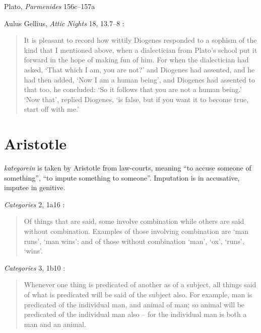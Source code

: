 \documentclass{article}
\begin{document}
Plato, {\em Parmenides} 156c--157a

Aulus Gellius, {\em Attic Nights} 18, 13.7--8 \cite[p.~32]{diogenes}:

\begin{quote}
It is pleasant to record how wittily Diogenes responded to
a sophism of the kind that I mentioned above, when a dialectician
from Plato's school put it forward in the hope of making fun of him.
For when the dialectician had asked, `That which I am, you are not?'
and Diogenes had assented, and he had then added, `Now I am a 
human being', and Diogenes had assented to that too, he concluded:
`So it follows that you are not a human being.' `Now that', replied
Diogenes, `is false, but if you want it to become true, start off with
me.'
\end{quote}

















\section{Aristotle}
{\em kategorein} is taken by Aristotle from law-courts, meaning ``to accuse someone of something'', ``to impute something
to someone''. Imputation is in accusative, imputee in genitive.

{\em Categories} 2, 1a16 \cite[p.~3]{ackrill}:

\begin{quote}
Of things that are said, some involve combination
while others are said without combination. Examples of
those involving combination are `man runs', `man wins';
and of those without combination `man', `ox', `runs', 
`wins'.
\end{quote}

{\em Categories} 3, 1b10 \cite[p.~4]{ackrill}:

\begin{quote}
Whenever one thing is predicated of another as of a subject, all things said of what is predicated will be said
of the subject also. For example, man is predicated of the individual man, and animal of man; so animal will be
predicated of the individual man also -- for the individual man is both a man and an animal.
\end{quote}
\end{document}
